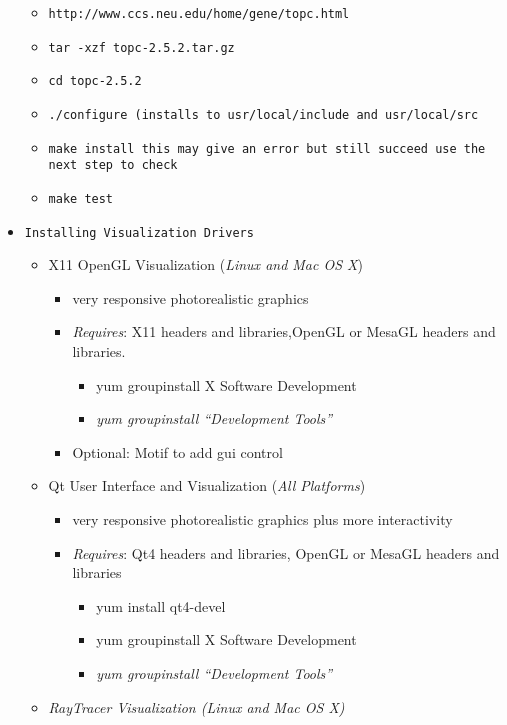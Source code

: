 \documentclass{article}
\begin{document}
\begin{itemize}
\begin{itemize}
\item \texttt{http://www.ccs.neu.edu/home/gene/topc.html}
\item \texttt{tar -xzf topc-2.5.2.tar.gz}
\item \texttt{cd topc-2.5.2}
\item \texttt{./configure (installs to usr/local/include and usr/local/src}
\item \texttt{make install this may give an error but still succeed use the next step to check}
\item \texttt{make test}
\end{itemize}
\item \texttt{Installing Visualization Drivers}

\begin{itemize}
\item X11 OpenGL Visualization (\emph{Linux and Mac OS X}) 

\begin{itemize}
\item very responsive photorealistic graphics
\item \emph{Requires}: X11 headers and libraries,OpenGL or MesaGL headers and libraries. 

\begin{itemize}
\item yum groupinstall {\textquotedbl}X Software Development{\textquotedbl}
\item \emph{yum groupinstall ``Development Tools''}
\end{itemize}
\item Optional: Motif to add gui control
\end{itemize}
\item Qt User Interface and Visualization (\emph{All Platforms}) 

\begin{itemize}
\item very responsive photorealistic graphics plus more interactivity
\item \emph{Requires}: Qt4 headers and libraries, OpenGL or MesaGL headers and libraries

\begin{itemize}
\item yum install qt4-devel
\item yum groupinstall {\textquotedbl}X Software Development{\textquotedbl}
\item \emph{yum groupinstall ``Development Tools''}
\end{itemize}
\end{itemize}
\item \emph{RayTracer Visualization (Linux and Mac OS X) }


\end{itemize}
\end{itemize}
\end{document}
